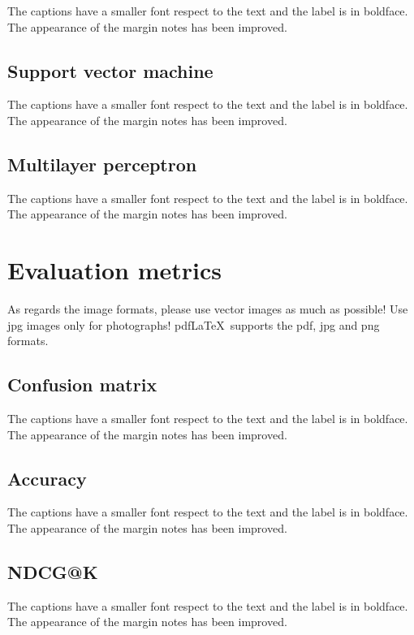 \documentclass[LaM,binding=0.6cm, english]{sapthesis}
\begin{document}
The captions have a smaller font respect to the text and the label is in boldface. The appearance of the margin notes has been improved.

\subsection{Support vector machine}

The captions have a smaller font respect to the text and the label is in boldface. The appearance of the margin notes has been improved.

\subsection{Multilayer perceptron}

The captions have a smaller font respect to the text and the label is in boldface. The appearance of the margin notes has been improved.


\section{Evaluation metrics}

As regards the image formats, please use vector images as much as possible! Use jpg images only for photographs! pdf\LaTeX\ supports the pdf, jpg and png formats.

\subsection{Confusion matrix}

The captions have a smaller font respect to the text and the label is in boldface. The appearance of the margin notes has been improved.

\subsection{Accuracy}

The captions have a smaller font respect to the text and the label is in boldface. The appearance of the margin notes has been improved.

\subsection{NDCG@K}

The captions have a smaller font respect to the text and the label is in boldface. The appearance of the margin notes has been improved.
\end{document}
